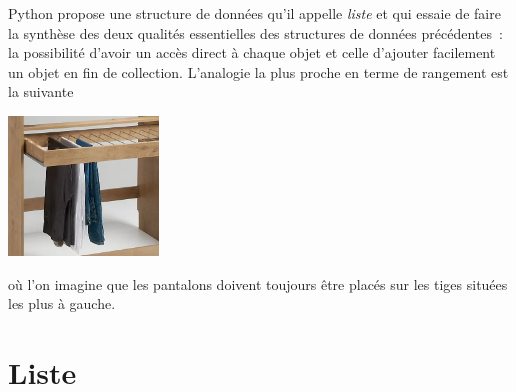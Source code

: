 \documentclass{magnoliaold}
\begin{document}
Python propose une structure de données qu'il appelle \emph{liste} et qui essaie de faire la synthèse
des deux qualités essentielles des structures de données précédentes~: la possibilité d'avoir un
accès direct à chaque objet et celle d'ajouter facilement un objet en fin de collection. L'analogie la plus
proche en terme de rangement est la suivante
\begin{center}
\includegraphics[width=0.3\textwidth]{../../commun/images/python-cours-jeans-tabdyn}
\end{center}
où l'on imagine que les pantalons doivent toujours être placés sur les tiges situées les plus à gauche.



\section{Liste}
\end{document}
